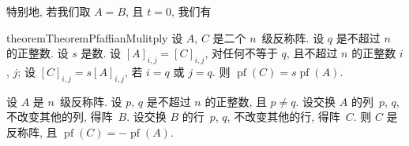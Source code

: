 特别地, 若我们取 \(A = B\), 且 \(t = 0\),
我们有

\begin{restatable}{theorem}{TheoremPfaffianMulitply}
    设 \(A\), \(C\) 是二个 \(n\)~级反称阵.
    设 \(q\) 是不超过 \(n\) 的正整数.
    设 \(s\) 是数.
    设 \([A]_{i,j} = [C]_{i,j}\),
    对任何不等于 \(q\), 且不超过 \(n\) 的正整数 \(i\), \(j\);
    设 \([C]_{i,j} = s[A]_{i,j}\),
    若 \(i = q\) 或 \(j = q\).
    则
    \(\operatorname{pf} {(C)}
    = s \operatorname{pf} {(A)}\).
\end{restatable}

\begin{theorem}
    设 \(A\) 是 \(n\)~级反称阵.
    设 \(p\), \(q\) 是不超过 \(n\) 的正整数, 且 \(p \neq q\).
    设交换 \(A\) 的列~\(p\), \(q\), 不改变其他的列, 得阵~\(B\).
    设交换 \(B\) 的行~\(p\), \(q\), 不改变其他的行, 得阵~\(C\).
    则 \(C\) 是反称阵, 且
    \(
    \operatorname{pf} {(C)} = -\operatorname{pf} {(A)}
    \).
\end{theorem}

